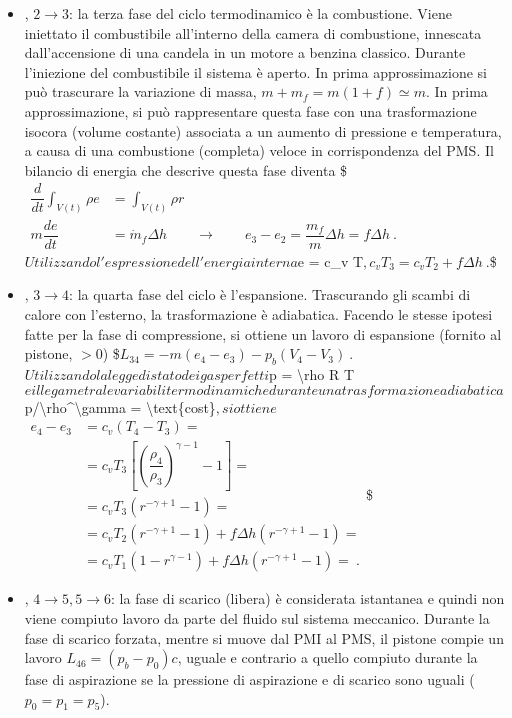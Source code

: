 \documentclass[letterpaper,10pt,italian]{jupyterBook}
\begin{document}
\begin{itemize}
\item {} 
\sphinxAtStartPar
{}, \(2 \rightarrow 3\): la terza fase del ciclo
termodinamico è la combustione. Viene iniettato il combustibile
all’interno della camera di combustione, innescata dall’accensione
di una candela in un motore a benzina classico. Durante l’iniezione
del combustibile il sistema è aperto. In prima approssimazione si
può trascurare la variazione di massa,
\(m + m_f = m ( 1 + f ) \simeq m\). In prima approssimazione, si può
rappresentare questa fase con una trasformazione isocora (volume
costante) associata a un aumento di pressione e temperatura, a causa
di una combustione (completa) veloce in corrispondenza del PMS. Il
bilancio di energia che descrive questa fase diventa
\$\(\begin{aligned}
 \dfrac{d}{dt} \displaystyle\int_{V(t)} \rho e & = \int_{V(t)} \rho r \\
 m \dfrac{d e}{d t} & = \dot{m}_f \Delta h \qquad \rightarrow \qquad
 e_3 - e_2 = \dfrac{ m_f }{ m } \Delta h  = f \Delta h \ .
\end{aligned}\)\( Utilizzando l'espressione dell'energia interna
\)e = c\_v T\(, \)\(c_v T_3 = c_v T_2 + f \Delta h \ .\)\$

\item {} 
\sphinxAtStartPar
{}, \(3 \rightarrow 4\): la quarta fase del ciclo è
l’espansione. Trascurando gli scambi di calore con l’esterno, la
trasformazione è adiabatica. Facendo le stesse ipotesi fatte per la
fase di compressione, si ottiene un lavoro di espansione (fornito al
pistone, \(>0\)) \$\(L_{34} = -m (e_4-e_3) - p_b ( V_4 - V_3 ) \ .\)\(
Utilizzando la legge di stato dei gas perfetti \)p = \textbackslash{}rho R T\( e il
legame tra le variabili termodinamiche durante una trasformazione
adiabatica \)p/\textbackslash{}rho\textasciicircum{}\textbackslash{}gamma = \textbackslash{}text\{cost\}\(, si ottiene
\)\(\begin{aligned}
 e_4 - e_3 & = c_v ( T_4 - T_3 ) = \\
  & = c_v T_3 \left[ \left( \dfrac{\rho_4}{\rho_3} \right)^{\gamma-1} - 1 \right] = \\
  & = c_v T_3 \left( r^{-\gamma+1} - 1\right) = \\
  & = c_v T_2 \left( r^{-\gamma+1} - 1\right) +
   f \Delta h \left( r^{-\gamma+1} - 1\right)  = \\ 
  & = c_v T_1 \left( 1 - r^{ \gamma-1}\right) +
   f \Delta h \left( r^{-\gamma+1} - 1\right)  = \ .
\end{aligned}\)\$

\item {} 
\sphinxAtStartPar
{}, \(4 \rightarrow 5, 5 \rightarrow 6\): la fase di scarico
(libera) è considerata istantanea e quindi non viene compiuto lavoro
da parte del fluido sul sistema meccanico. Durante la fase di
scarico forzata, mentre si muove dal PMI al PMS, il pistone compie
un lavoro \(L_{46} = (p_b - p_0) c\), uguale e contrario a quello
compiuto durante la fase di aspirazione se la pressione di
aspirazione e di scarico sono uguali (\(p_0 = p_1 = p_5\)).

\end{itemize}
\end{document}
